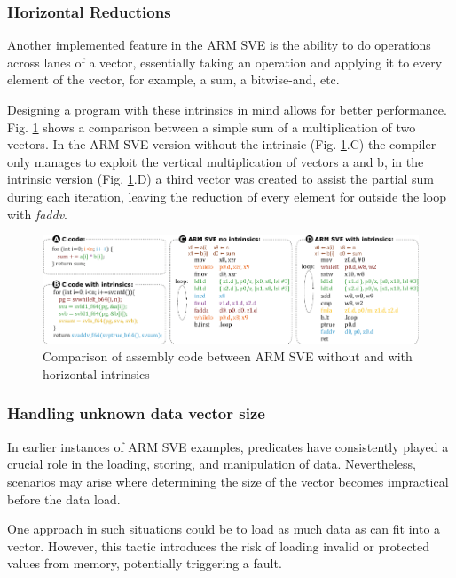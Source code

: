 \subsubsection{Horizontal Reductions}

Another implemented feature in the ARM SVE is the ability to do operations across lanes of a vector, essentially taking an operation and applying it to every element of the vector, for example, a sum, a bitwise-and, etc. 

Designing a program with these intrinsics in mind allows for better performance. Fig. \ref{fig:horizontal-reductions} shows a comparison between a simple sum of a multiplication of two vectors. In the ARM SVE version without the intrinsic (Fig. \ref{fig:horizontal-reductions}.C) the compiler only manages to exploit the vertical multiplication of vectors a and b, in the intrinsic version (Fig. \ref{fig:horizontal-reductions}.D) a third vector was created to assist the partial sum during each iteration, leaving the reduction of every element for outside the loop with \textit{faddv}.

\begin{figure}[H]
	\begin{center}
 		\includegraphics[width=\linewidth]{images/horizontal-reductions.pdf}
 		\caption{Comparison of assembly code between ARM SVE without and with horizontal intrinsics}
 		\label{fig:horizontal-reductions}
	\end{center} 
\end{figure}

\subsubsection{Handling unknown data vector size}


In earlier instances of ARM SVE examples, predicates have consistently played a crucial role in the loading, storing, and manipulation of data. Nevertheless, scenarios may arise where determining the size of the vector becomes impractical before the data load. 

One approach in such situations could be to load as much data as can fit into a vector. However, this tactic introduces the risk of loading invalid or protected values from memory, potentially triggering a fault.

